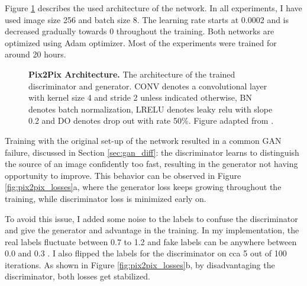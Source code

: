 \documentclass[12pt]{report}
\begin{document}
Figure \ref{fig:pix2pix_arch} describes the used architecture of the network. In all experiments, I have used image size 256 and batch size 8. The learning rate starts at 0.0002 and is decreased gradually towards 0 throughout the training. Both networks are optimized using Adam optimizer. Most of the experiments were trained for around 20 hours.

\begin{figure}[h]
\centering
{}\vspace{.5cm}
\caption{\label{fig:pix2pix_arch} \textbf{Pix2Pix Architecture.} The architecture of the trained  discriminator and generator. CONV denotes a convolutional layer with kernel size 4 and stride 2 unless indicated otherwise, BN denotes batch normalization, LRELU denotes leaky relu with slope 0.2 and DO denotes drop out with rate 50\%. Figure adapted from \cite{hesse_image--image_2017}.}
\end{figure}

\pagebreak
Training with the original set-up of the network resulted in a common GAN failure, discussed in Section \ref{sec:gan_diff}: the discriminator learns to distinguish the source of an image confidently too fast, resulting in the generator not having opportunity to improve. This behavior can be observed in Figure \ref{fig:pix2pix_losses}a, where the generator loss keeps growing throughout the training, while discriminator loss is minimized early on.

To avoid this issue, I added some noise to the labels to confuse the discriminator and give the generator and advantage in the training. In my implementation, the real labels fluctuate between 0.7 to 1.2 and fake labels can be anywhere between 0.0 and 0.3 \cite{chintala_starter_2018}. I also flipped the labels for the discriminator on cca 5 out of 100 iterations. As shown in Figure \ref{fig:pix2pix_losses}b, by disadvantaging the discriminator, both losses get stabilized.
\end{document}
